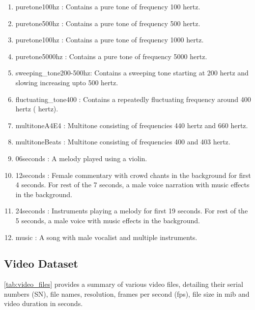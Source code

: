 \documentclass{ioereport}
\begin{document}
    \begin{enumerate}
        \item puretone100hz : Contains a pure tone of frequency 100 hertz.
        \item puretone500hz : Contains a pure tone of frequency 500 hertz.
        \item puretone100hz : Contains a pure tone of frequency 1000 hertz.
        \item puretone5000hz : Contains a pure tone of frequency 5000 hertz. 
        \item sweeping\_tone200-500hz: Contains a sweeping tone starting at 200 hertz and slowing increasing upto 500 hertz.
        \item fluctuating\_tone400 : Contains a repeatedly fluctuating frequency around 400 hertz ( hertz).
        \item multitoneA4E4 : Multitone consisting of frequencies 440 hertz and 660 hertz.
        \item multitoneBeats : Multitone consisting of frequencies 400 and 403 hertz.
        \item 06seconds : A melody played using a violin.
        \item 12seconds : Female commentary with crowd chants in the background for first 4 seconds. For rest of the 7 seconds, a male voice narration with music effects in the background.
        \item 24seconds : Instruments playing a melody for first 19 seconds. For rest of the 5 seconds, a male voice with music effects in the background.
        \item music : A song with male vocalist and multiple instruments.
        
    \end{enumerate}

\subsection{Video Dataset}

\autoref{tab:video_files} provides a summary of various video files, detailing their serial numbers (SN), file names, resolution, frames per second (fps), file size in \gls{mib} and video duration in seconds.
\end{document}
